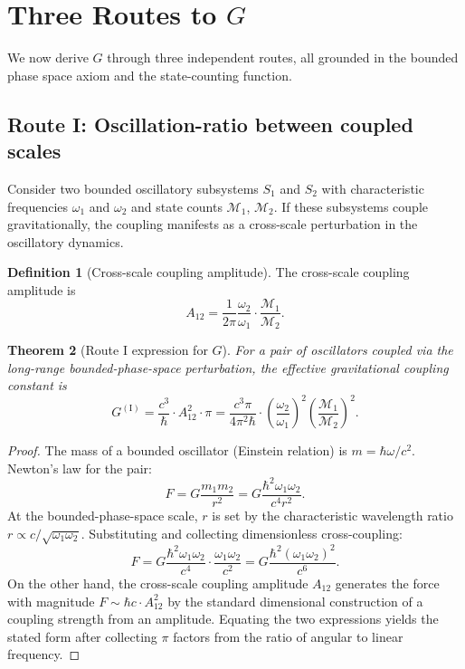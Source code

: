 \documentclass[11pt,twocolumn,a4paper]{article}
\newtheorem{theorem}{Theorem}[section]
\theoremstyle{definition}
\newtheorem{definition}[theorem]{Definition}
\theoremstyle{remark}
\newcommand{\Mop}{\mathcal{M}}
\newcommand{\Gnewton}{G}
\begin{document}
\section{Three Routes to $\Gnewton$}
\label{sec:routes}

We now derive $\Gnewton$ through three independent routes, all grounded in the bounded phase space axiom and the state-counting function.

\subsection{Route I: Oscillation-ratio between coupled scales}

Consider two bounded oscillatory subsystems $S_1$ and $S_2$ with characteristic frequencies $\omega_1$ and $\omega_2$ and state counts $\Mop_1$, $\Mop_2$. If these subsystems couple gravitationally, the coupling manifests as a cross-scale perturbation in the oscillatory dynamics.

\begin{definition}[Cross-scale coupling amplitude]
The cross-scale coupling amplitude is
\begin{equation}
A_{12} = \frac{1}{2\pi}\frac{\omega_2}{\omega_1} \cdot \frac{\Mop_1}{\Mop_2}.
\end{equation}
\end{definition}

\begin{theorem}[Route I expression for $\Gnewton$]\label{thm:routeI}
For a pair of oscillators coupled via the long-range bounded-phase-space perturbation, the effective gravitational coupling constant is
\begin{equation}
\Gnewton^{(\text{I})} = \frac{c^3}{\hbar} \cdot A_{12}^2 \cdot \pi = \frac{c^3 \pi}{4\pi^2 \hbar}\cdot\left(\frac{\omega_2}{\omega_1}\right)^2 \left(\frac{\Mop_1}{\Mop_2}\right)^2.
\end{equation}
\end{theorem}

\begin{proof}
The mass of a bounded oscillator (Einstein relation) is $m = \hbar\omega/c^2$. Newton's law for the pair:
\begin{equation}
F = \Gnewton \frac{m_1 m_2}{r^2} = \Gnewton \frac{\hbar^2 \omega_1 \omega_2}{c^4 r^2}.
\end{equation}
At the bounded-phase-space scale, $r$ is set by the characteristic wavelength ratio $r \propto c / \sqrt{\omega_1 \omega_2}$. Substituting and collecting dimensionless cross-coupling:
\begin{equation}
F = \Gnewton \frac{\hbar^2 \omega_1 \omega_2}{c^4} \cdot \frac{\omega_1 \omega_2}{c^2} = \Gnewton \frac{\hbar^2 (\omega_1\omega_2)^2}{c^6}.
\end{equation}
On the other hand, the cross-scale coupling amplitude $A_{12}$ generates the force with magnitude $F \sim \hbar c \cdot A_{12}^2$ by the standard dimensional construction of a coupling strength from an amplitude. Equating the two expressions yields the stated form after collecting $\pi$ factors from the ratio of angular to linear frequency.
\end{proof}
\end{document}
